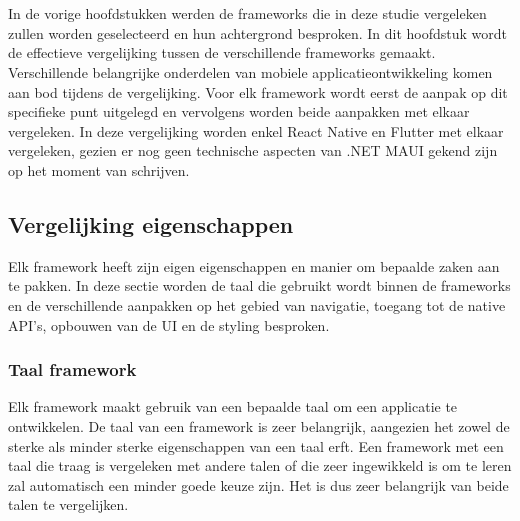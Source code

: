 
\chapter{}
\label{ch:methodologie}


In de vorige hoofdstukken werden de frameworks die in deze studie vergeleken zullen worden geselecteerd en hun achtergrond besproken. In dit hoofdstuk wordt de effectieve vergelijking tussen de verschillende frameworks gemaakt. Verschillende belangrijke onderdelen van mobiele applicatieontwikkeling komen aan bod tijdens de vergelijking. Voor elk framework wordt eerst de aanpak op dit specifieke punt uitgelegd en vervolgens worden beide aanpakken met elkaar vergeleken. In deze vergelijking worden enkel React Native en Flutter met elkaar vergeleken, gezien er nog geen technische aspecten van .NET MAUI gekend zijn op het moment van schrijven.


\section{Vergelijking eigenschappen}
\label{sec:vglEigenschappen}

Elk framework heeft zijn eigen eigenschappen en manier om bepaalde zaken aan te pakken. In deze sectie worden de taal die gebruikt wordt binnen de frameworks en de verschillende aanpakken op het gebied van navigatie, toegang tot de native API's, opbouwen van de UI en de styling besproken.

\subsection{Taal framework}
\label{subsec:taalFramework}

Elk framework maakt gebruik van een bepaalde taal om een applicatie te ontwikkelen. De taal van een framework is zeer belangrijk, aangezien het zowel de sterke als minder sterke eigenschappen van een taal erft. Een framework met een taal die traag is vergeleken met andere talen of die zeer ingewikkeld is om te leren zal automatisch een minder goede keuze zijn. Het is dus zeer belangrijk van beide talen te vergelijken.

